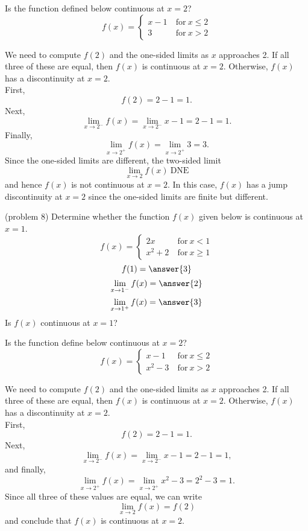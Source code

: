 \documentclass{ximera}
\begin{document}
\begin{example}[example 8]
Is the function defined below continuous at $x = 2$?
\[
f(x) = \left\{
     \begin{array}{lr}
       x-1 & \ \text{for} \  x \leq 2 \\
       3 & \ \text{for} \ x > 2
     \end{array}
   \right.
\]


We need to  compute $f(2)$ and the one-sided limits as $x$ approaches 2.
If all three of these are equal, then $f(x)$ is continuous at $x=2$.
Otherwise, $f(x)$ has a discontinuity at $x=2$.\\
First, 
\[
f(2) = 2-1 = 1.
\]
Next,  
\[\lim_{x \to 2^-} f(x) = \lim_{x \to 2^-} x-1 = 2-1 = 1.\]
Finally,
\[\lim_{x \to 2^+} f(x) = \lim_{x \to 2^+}3 = 3.\]
Since the one-sided limits are different, the two-sided limit
\[
\lim_{x \to 2} f(x) \ \text{DNE}
\]
and hence $f(x)$ is not continuous at $x = 2$.
In this case, $f(x)$ has a jump discontinuity at $x=2$ since the one-sided limits are finite but different.
\end{example}

\begin{problem}(problem 8)
Determine whether the function $f(x)$ given below is continuous at $x = 1$.
\[
f(x) = \left\{
     \begin{array}{lr}
       2x & \ \text{for} \  x < 1 \\
       x^2 + 2 & \ \text{for} \ x \geq 1
     \end{array}
   \right.
\]
\[
f(1) = \answer{3}
\]
\[
\lim_{x \to 1^-} f(x) = \answer{2}
\]
\[
\lim_{x \to 1^+} f(x) = \answer{3}
\]
Is $f(x)$ continuous at $x = 1$?
\begin{multipleChoice}
\end{multipleChoice}
\end{problem}





\begin{example}[example 9]
Is the function define below continuous at $x = 2$?
\[f(x) = \left\{
     \begin{array}{lr}
       x-1 & \ \text{for} \  x \leq 2 \\
       x^2 - 3 & \ \text{for} \ x > 2
     \end{array}
   \right.
\]

We need to  compute $f(2)$ and the one-sided limits as $x$ approaches 2.
If all three of these are equal, then $f(x)$ is continuous at $x=2$.
Otherwise, $f(x)$ has a discontinuity at $x=2$.\\
First, 
\[
f(2) = 2-1 = 1.
\]
Next, 
\[
\lim_{x \to 2^-} f(x) = \lim_{x \to 2^-} x-1 = 2-1 = 1,
\]
and finally,
\[
\lim_{x \to 2^+} f(x) = \lim_{x \to 2^+} x^2 - 3 = 2^2 - 3 = 1.
\]
Since all three of these values are equal, we can write
\[
\lim_{x \to 2} f(x) = f(2)
\]
and conclude that $f(x)$ is continuous at $x = 2$.
\end{example}
\end{document}
